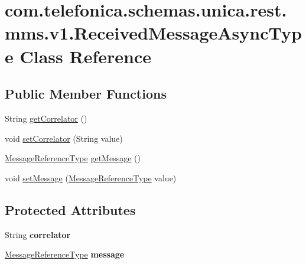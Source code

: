 \hypertarget{classcom_1_1telefonica_1_1schemas_1_1unica_1_1rest_1_1mms_1_1v1_1_1ReceivedMessageAsyncType}{
\section{com.telefonica.schemas.unica.rest.mms.v1.ReceivedMessageAsyncType Class Reference}
\label{classcom_1_1telefonica_1_1schemas_1_1unica_1_1rest_1_1mms_1_1v1_1_1ReceivedMessageAsyncType}
}
\subsection*{Public Member Functions}
\begin{DoxyCompactItemize}
\item 
String \hyperlink{classcom_1_1telefonica_1_1schemas_1_1unica_1_1rest_1_1mms_1_1v1_1_1ReceivedMessageAsyncType_a320b55f5899fc58a74bb465bf2a1fd39}{getCorrelator} ()
\item 
void \hyperlink{classcom_1_1telefonica_1_1schemas_1_1unica_1_1rest_1_1mms_1_1v1_1_1ReceivedMessageAsyncType_ad45f0da16217b8acf5da83b31004259b}{setCorrelator} (String value)
\item 
\hyperlink{classcom_1_1telefonica_1_1schemas_1_1unica_1_1rest_1_1mms_1_1v1_1_1MessageReferenceType}{MessageReferenceType} \hyperlink{classcom_1_1telefonica_1_1schemas_1_1unica_1_1rest_1_1mms_1_1v1_1_1ReceivedMessageAsyncType_a914a29ee0be56ef22681de52695c989c}{getMessage} ()
\item 
void \hyperlink{classcom_1_1telefonica_1_1schemas_1_1unica_1_1rest_1_1mms_1_1v1_1_1ReceivedMessageAsyncType_ad34da64e2f90d3d1cec11ef9a2fdf0eb}{setMessage} (\hyperlink{classcom_1_1telefonica_1_1schemas_1_1unica_1_1rest_1_1mms_1_1v1_1_1MessageReferenceType}{MessageReferenceType} value)
\end{DoxyCompactItemize}
\subsection*{Protected Attributes}
\begin{DoxyCompactItemize}
\item 
\hypertarget{classcom_1_1telefonica_1_1schemas_1_1unica_1_1rest_1_1mms_1_1v1_1_1ReceivedMessageAsyncType_a24d065c50f4d16c94d23a6f2728bfe3a}{
String {\bfseries correlator}}
\label{classcom_1_1telefonica_1_1schemas_1_1unica_1_1rest_1_1mms_1_1v1_1_1ReceivedMessageAsyncType_a24d065c50f4d16c94d23a6f2728bfe3a}

\item 
\hypertarget{classcom_1_1telefonica_1_1schemas_1_1unica_1_1rest_1_1mms_1_1v1_1_1ReceivedMessageAsyncType_acc58db1d93222984b1127ad67b754dbe}{
\hyperlink{classcom_1_1telefonica_1_1schemas_1_1unica_1_1rest_1_1mms_1_1v1_1_1MessageReferenceType}{MessageReferenceType} {\bfseries message}}
\label{classcom_1_1telefonica_1_1schemas_1_1unica_1_1rest_1_1mms_1_1v1_1_1ReceivedMessageAsyncType_acc58db1d93222984b1127ad67b754dbe}

\end{DoxyCompactItemize}


